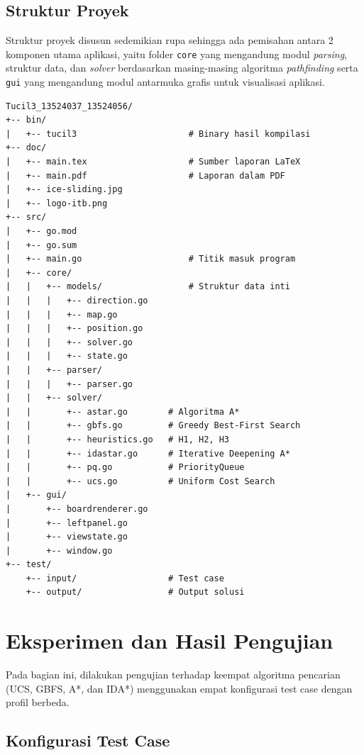 \documentclass[12pt,a4paper]{article}
\begin{document}
\subsection{Struktur Proyek}
    
    Struktur proyek disusun sedemikian rupa sehingga ada pemisahan antara 2 komponen utama aplikasi, yaitu folder \texttt{core} yang mengandung modul \textit{parsing}, struktur data, dan \textit{solver} berdasarkan masing-masing algoritma \textit{pathfinding} serta \texttt{gui} yang mengandung modul antarmuka grafis untuk visualisasi aplikasi. 

\begin{lstlisting}[style=bash, caption={Struktur direktori proyek}]
Tucil3_13524037_13524056/
+-- bin/
|   +-- tucil3                      # Binary hasil kompilasi
+-- doc/
|   +-- main.tex                    # Sumber laporan LaTeX
|   +-- main.pdf                    # Laporan dalam PDF
|   +-- ice-sliding.jpg             
|   +-- logo-itb.png               
+-- src/
|   +-- go.mod
|   +-- go.sum
|   +-- main.go                     # Titik masuk program
|   +-- core/
|   |   +-- models/                 # Struktur data inti
|   |   |   +-- direction.go
|   |   |   +-- map.go
|   |   |   +-- position.go
|   |   |   +-- solver.go
|   |   |   +-- state.go
|   |   +-- parser/
|   |   |   +-- parser.go
|   |   +-- solver/
|   |       +-- astar.go        # Algoritma A*
|   |       +-- gbfs.go         # Greedy Best-First Search
|   |       +-- heuristics.go   # H1, H2, H3
|   |       +-- idastar.go      # Iterative Deepening A*
|   |       +-- pq.go           # PriorityQueue
|   |       +-- ucs.go          # Uniform Cost Search
|   +-- gui/
|       +-- boardrenderer.go
|       +-- leftpanel.go
|       +-- viewstate.go
|       +-- window.go
+-- test/
    +-- input/                  # Test case
    +-- output/                 # Output solusi
\end{lstlisting}


\section{Eksperimen dan Hasil Pengujian}

Pada bagian ini, dilakukan pengujian terhadap keempat algoritma pencarian (UCS, GBFS, A*, dan IDA*) menggunakan empat konfigurasi test case dengan profil berbeda.

\subsection{Konfigurasi Test Case}
\end{document}
